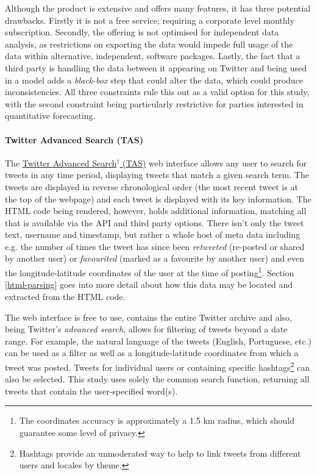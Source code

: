 \documentclass{article}
\begin{document}
Although the product is extensive and offers many features, it has three potential drawbacks. Firstly it is not a free service; requiring a corporate level monthly subscription. Secondly, the offering is not optimised for independent data analysis, as restrictions on exporting the data would impede full usage of the data within alternative, independent, software packages. Lastly, the fact that a third party is handling the data between it appearing on Twitter and being used in a model adds a \emph{black-box} step that could alter the data, which could produce inconsistencies. All three constraints rule this out as a valid option for this study, with the second constraint being particularly restrictive for parties interested in quantitative forecasting.


\paragraph{Twitter Advanced Search (TAS) \label{TAS}}
\label{sec-1-2-3-3}

The \href{https://twitter.com/search-advanced?lang\%3Den}{Twitter Advanced Search$^{\dag{}}$ (TAS)} web interface allows any user to search for tweets in any time period, displaying tweets that match a given search term. The tweets are displayed in reverse chronological order (the most recent tweet is at the top of the webpage) and each tweet is displayed with its key information. The HTML code being rendered, however, holds additional information, matching all that is available via the API and third party options. There isn't only the tweet text, username and timestamp, but rather a whole host of meta data including e.g. the number of times the tweet has since been \emph{retweeted} (re-posted or shared by another user) or \emph{favourited} (marked as a favourite by another user) and even the longitude-latitude coordinates of the user at the time of posting\footnote{The coordinates accuracy is approximately a 1.5 km radius, which should guarantee some level of privacy.}. Section \ref{html-parsing} goes into more detail about how this data may be located and extracted from the HTML code.

The web interface is free to use, contains the entire Twitter archive and also, being Twitter's \emph{advanced search}, allows for filtering of tweets beyond a date range. For example, the natural language of the tweets (English, Portuguese, etc.) can be used as a filter as well as a longitude-latitude coordinates from which a tweet was posted. Tweets for individual users or containing specific hashtags\footnote{Hashtags provide an unmoderated way to help to link tweets from different users and locales by theme.} can also be selected. This study uses solely the common search function, returning all tweets that contain the user-specified word(s).
\end{document}
